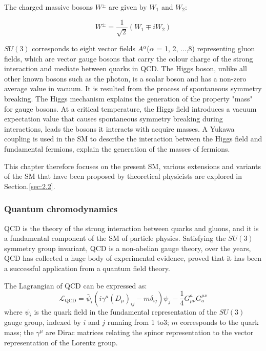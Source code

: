 \documentclass[UTF8,12pt]{ctexart}
\numberwithin{equation}{section}
\begin{document}
The charged massive bosons $W$$^\pm$ are given by $W$$_1$ and $W$$_2$:


\begin{equation}
W^{\pm}=\frac{1}{\sqrt{2}}\left(W_{1} \mp i W_{2}\right)
 \end{equation}

$SU(3)$ corresponds to eight vector fields $A$$^\alpha$($\alpha$ = 1, 2, ...,8) representing gluon fields, which are vector gauge bosons that carry the colour charge of the strong interaction and mediate between quarks in QCD.
The Higgs boson, unlike all other known bosons such as the photon, is a scalar boson and has a non-zero average value in vacuum. It is resulted from the process of spontaneous symmetry breaking. The Higgs mechanism explains the generation of the property "mass" for gauge bosons. At a critical temperature, the Higgs field introduces a vacuum expectation value that causes spontaneous symmetry breaking during interactions, leads the bosons it interacts with acquire masses. A Yukawa coupling is used in the SM to describe the interaction between the Higgs field and fundamental fermions, explain the generation of the masses of fermions. 



This chapter therefore focuses on the present SM, various extensions and variants of the SM that have been proposed by theoretical physicists are explored in Section.\ref{sec:2.2}.

\subsubsection{Quantum chromodynamics}
\label{sec:2.1.1}

QCD is the theory of the strong interaction between quarks and gluons, and it is a fundamental component of the SM of particle physics. Satisfying the $SU(3)$ symmetry group invariant, QCD is a non-abelian gauge theory, over the years, QCD has collected a huge body of experimental evidence, proved that it has been a successful application from a quantum field theory.

The Lagrangian of QCD can be expressed as:
\begin{equation}
\mathcal{L}_{\mathrm{QCD}}=\bar{\psi}_{i}\left(i \gamma^{\mu}\left(D_{\mu}\right)_{i j}-m \delta_{i j}\right) \psi_{j}-\frac{1}{4} G_{\mu \nu}^{a} G_{a}^{\mu \nu}
\end{equation}
where $\psi_{i}$ is the quark field in the fundamental representation of the $SU(3)$ gauge group, indexed by $i$ and $j$ running from 1 to3; $m$ corresponds to the quark mass; the $\gamma^{\mu}$ are Dirac matrices relating the spinor representation to the vector representation of the Lorentz group.
\end{document}
